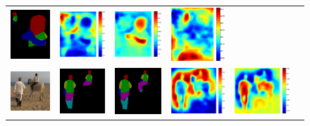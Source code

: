 \documentclass[10pt,twocolumn,letterpaper]{article}
\begin{document}
\begin{figure}
\begin{tabular}{c c c c c c}
   \includegraphics[height=0.13\linewidth]{fig/voc10_part/res_sharenet/2008_003136.png} &
   \includegraphics[height=0.13\linewidth]{fig/voc10_part/att1/2008_003136.pdf} &
   \includegraphics[height=0.13\linewidth]{fig/voc10_part/att2/2008_003136.pdf} &
   \includegraphics[height=0.13\linewidth]{fig/voc10_part/att3/2008_003136.pdf} \\
   \includegraphics[height=0.13\linewidth]{fig/voc10_part/img/2008_003344.jpg} &
   \includegraphics[height=0.13\linewidth]{fig/voc10_part/res_baseline/2008_003344.png} &
   \includegraphics[height=0.13\linewidth]{fig/voc10_part/res_sharenet/2008_003344.png} &
   \includegraphics[height=0.13\linewidth]{fig/voc10_part/att1/2008_003344.pdf} &
   \includegraphics[height=0.13\linewidth]{fig/voc10_part/att2/2008_003344.pdf} &

\end{tabular}
\end{figure}
\end{document}
